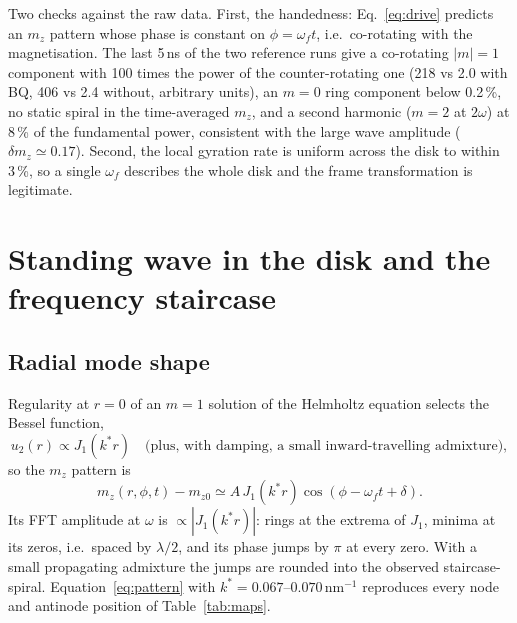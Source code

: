 \documentclass[11pt,a4paper]{article}
\begin{document}
Two checks against the raw data.  First, the handedness: Eq.~\eqref{eq:drive} predicts an $m_z$ pattern whose
phase is constant on $\phi=\omega_f t$, i.e.\ co-rotating with the magnetisation.  The last 5\,ns of the two
reference runs give a co-rotating $|m|=1$ component with 100 times the power of the counter-rotating one
(218 vs 2.0 with BQ, 406 vs 2.4 without, arbitrary units), an $m=0$ ring component below 0.2\,\%, no static spiral
in the time-averaged $m_z$, and a second harmonic ($m=2$ at $2\omega$) at 8\,\% of the fundamental power,
consistent with the large wave amplitude ($\delta m_z\simeq0.17$).  Second, the local gyration rate is uniform
across the disk to within 3\,\%, so a single $\omega_f$ describes the whole disk and the frame transformation is
legitimate.

\section{Standing wave in the disk and the frequency staircase}
\label{sec:cavity}

\subsection{Radial mode shape}
Regularity at $r=0$ of an $m=1$ solution of the Helmholtz equation selects the Bessel function,
\begin{equation}
u_2(r)\propto J_1(k^\ast r)\quad\text{(plus, with damping, a small inward-travelling admixture)},
\end{equation}
so the $m_z$ pattern is
\begin{equation}
m_z(r,\phi,t)-m_{z0}\simeq A\,J_1(k^\ast r)\cos(\phi-\omega_f t+\delta).
\label{eq:pattern}
\end{equation}
Its FFT amplitude at $\omega$ is $\propto|J_1(k^\ast r)|$: rings at the extrema of $J_1$, minima at its zeros,
i.e.\ spaced by $\lambda/2$, and its phase jumps by $\pi$ at every zero.  With a small propagating admixture the
jumps are rounded into the observed staircase-spiral.  Equation~\eqref{eq:pattern} with
$k^\ast=0.067$--$0.070\,\mathrm{nm}^{-1}$ reproduces every node and antinode position of Table~\ref{tab:maps}.
\end{document}
